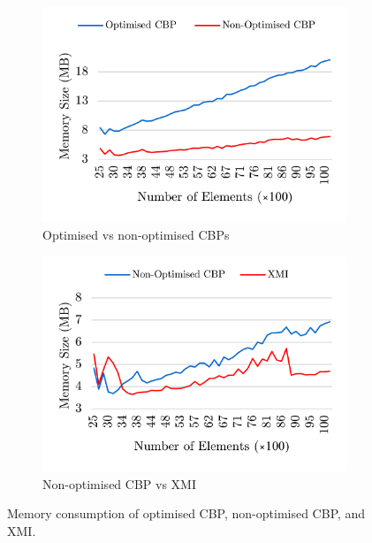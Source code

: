 \documentclass{llncs}
\begin{document}
\begin{figure}[ht]	
	\begin{subfigure}[t]{0.5\linewidth}
		\includegraphics[width=\linewidth]{memory_use_conf}
		\caption{Optimised vs non-optimised CBPs}\label{fig:memory_use_conf_ocbp_xmi}		
	\end{subfigure}
	\hfill
	\begin{subfigure}[t]{0.5\linewidth}
		\includegraphics[width=\linewidth]{memory_use_conf_cbp_xmi}
		\caption{Non-optimised CBP vs XMI}\label{fig:memory_use_conf_cbp_xmi}
	\end{subfigure}
	\caption{Memory consumption of optimised CBP, non-optimised CBP, and XMI.}
	\label{fig:memory_use}
\end{figure}
\end{document}
